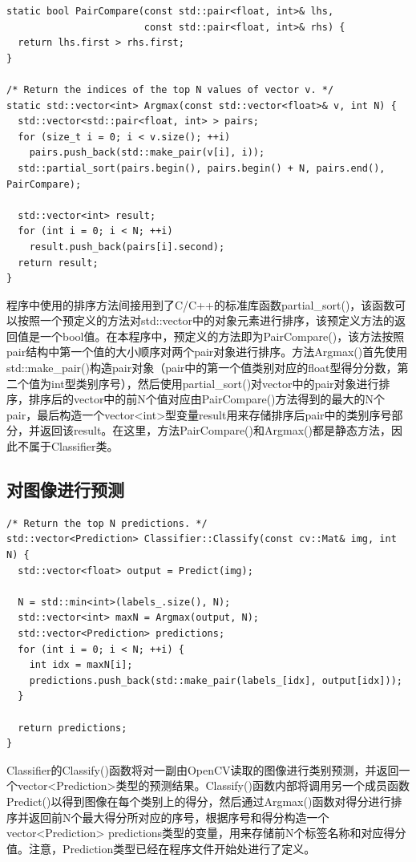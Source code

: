 \begin{verbatim}
static bool PairCompare(const std::pair<float, int>& lhs,
                        const std::pair<float, int>& rhs) {
  return lhs.first > rhs.first;
}

/* Return the indices of the top N values of vector v. */
static std::vector<int> Argmax(const std::vector<float>& v, int N) {
  std::vector<std::pair<float, int> > pairs;
  for (size_t i = 0; i < v.size(); ++i)
    pairs.push_back(std::make_pair(v[i], i));
  std::partial_sort(pairs.begin(), pairs.begin() + N, pairs.end(), PairCompare);

  std::vector<int> result;
  for (int i = 0; i < N; ++i)
    result.push_back(pairs[i].second);
  return result;
}
\end{verbatim}
程序中使用的排序方法间接用到了C/C++的标准库函数partial\_sort()，该函数可以按照一个预定义的方法对std::vector中的对象元素进行排序，该预定义方法的返回值是一个bool值。在本程序中，预定义的方法即为PairCompare()，该方法按照pair结构中第一个值的大小顺序对两个pair对象进行排序。方法Argmax()首先使用std::make\_pair()构造pair对象（pair中的第一个值类别对应的float型得分分数，第二个值为int型类别序号），然后使用partial\_sort()对vector中的pair对象进行排序，排序后的vector中的前N个值对应由PairCompare()方法得到的最大的N个pair，最后构造一个vector<int>型变量result用来存储排序后pair中的类别序号部分，并返回该result。在这里，方法PairCompare()和Argmax()都是静态方法，因此不属于Classifier类。

\subsection{对图像进行预测}
\begin{verbatim}
/* Return the top N predictions. */
std::vector<Prediction> Classifier::Classify(const cv::Mat& img, int N) {
  std::vector<float> output = Predict(img);

  N = std::min<int>(labels_.size(), N);
  std::vector<int> maxN = Argmax(output, N);
  std::vector<Prediction> predictions;
  for (int i = 0; i < N; ++i) {
    int idx = maxN[i];
    predictions.push_back(std::make_pair(labels_[idx], output[idx]));
  }

  return predictions;
}
\end{verbatim}
Classifier的Classify()函数将对一副由OpenCV读取的图像进行类别预测，并返回一个vector<Prediction>类型的预测结果。Classify()函数内部将调用另一个成员函数Predict()以得到图像在每个类别上的得分，然后通过Argmax()函数对得分进行排序并返回前N个最大得分所对应的序号，根据序号和得分构造一个vector<Prediction> predictions类型的变量，用来存储前N个标签名称和对应得分值。注意，Prediction类型已经在程序文件开始处进行了定义。

